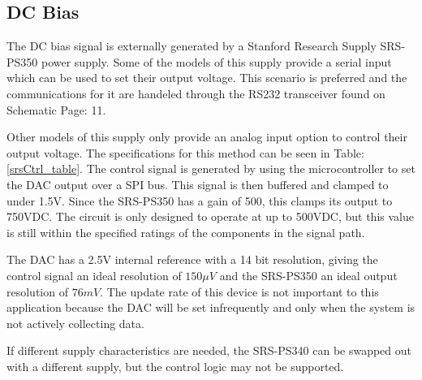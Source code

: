 \subsection {DC Bias}
\label{sec:dcBias}

The DC bias signal is externally generated by a Stanford Research Supply SRS-PS350 power supply. Some of the models of this supply provide a serial input which can be used to set their output voltage. This scenario is preferred and the communications for it are handeled through the RS232 transceiver found on Schematic Page: 11.



Other models of this supply only provide an analog input option to control their output voltage. The specifications for this method can be seen in Table: \ref{srsCtrl_table}. The control signal is generated by using the microcontroller to set the DAC output over a SPI bus. This signal is then buffered and clamped to under 1.5V. Since the SRS-PS350 has a gain of 500, this clamps its output to 750VDC. The circuit is only designed to operate at up to 500VDC, but this value is still within the specified ratings of the components in the signal path.

The DAC has a 2.5V internal reference with a 14 bit resolution, giving the control signal an ideal resolution of $150\mu V$ and the SRS-PS350 an ideal output resolution of $76mV$. The update rate of this device is not important to this application because the DAC will be set infrequently and only when the system is not actively collecting data.

If different supply characteristics are needed, the SRS-PS340 can be swapped out with a different supply, but the control logic may not be supported.

